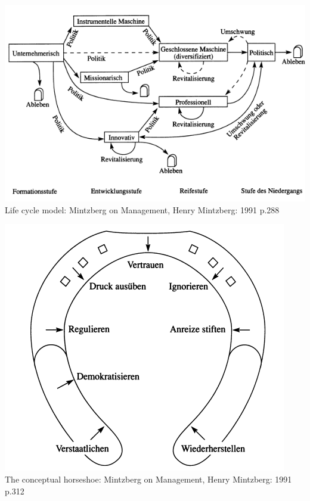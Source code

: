 \documentclass[a4paper,12pt]{article}
\begin{document}
\begin{center}
\includegraphics[scale=0.7]{lifecycle.png}\\
{Life cycle model: Mintzberg on Management, Henry Mintzberg: 1991
  p.288}
\label{fig:lifecycle}

\includegraphics[scale=0.7]{control.png}\\
{The conceptual horseshoe: Mintzberg on Management, Henry Mintzberg:
  1991 p.312}
\label{fig:control}
\end{center}
\end{document}
